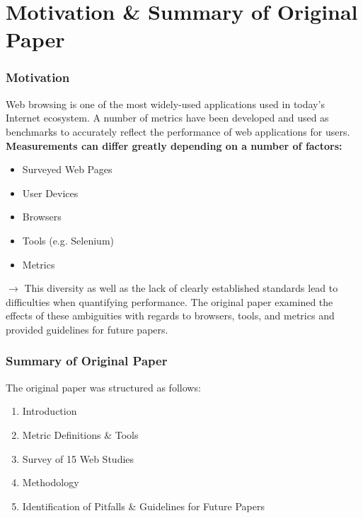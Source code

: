 \section{Motivation \& Summary of Original Paper}

\begin{frame}
    \frametitle{Motivation}
    Web browsing is one of the most widely-used applications used in today's Internet ecosystem. A number of metrics have been developed and used as benchmarks to accurately reflect the performance of web applications for users. \textbf{Measurements can differ greatly depending on a number of factors:}
    \begin{itemize}
        \item Surveyed Web Pages
        \item User Devices
        \item Browsers
        \item Tools (e.g. Selenium)
        \item Metrics
    \end{itemize}
    $\boldsymbol{\rightarrow}$ This diversity as well as the lack of clearly established standards lead to difficulties when quantifying performance. The original paper \cite{10.1007/978-3-030-15986-3_19} examined the effects of these ambiguities with regards to browsers, tools, and metrics and provided guidelines for future papers.
\end{frame}

\begin{frame}
    \frametitle{Summary of Original Paper}
	The original paper \cite{10.1007/978-3-030-15986-3_19} was structured as follows:
    \begin{enumerate}
        \item Introduction
        \item Metric Definitions \& Tools
        \item Survey of 15 Web Studies
        \item Methodology
        \item Identification of Pitfalls \& Guidelines for Future Papers
    \end{enumerate}
\end{frame}